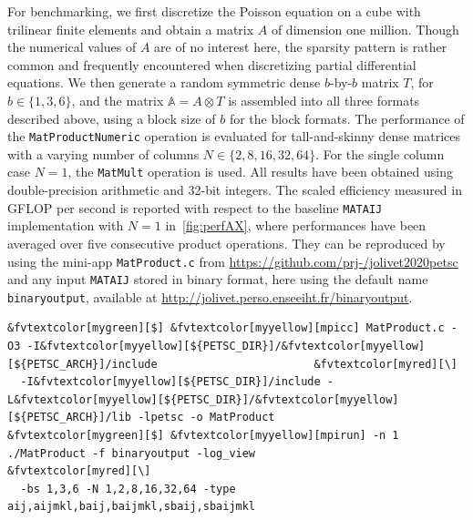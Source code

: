 \documentclass[3p,11pt]{elsarticle}
\newcommand{\pk}[1]{\texttt{#1}}
\begin{document}
For benchmarking, we first discretize the Poisson equation on a cube with trilinear finite elements
and obtain a matrix $A$ of dimension one million. Though the numerical
values of $A$ are of no interest here, the sparsity pattern is rather common and frequently encountered when
discretizing partial differential equations. We then generate a random symmetric dense $b$-by-$b$ matrix $T$,
for $b \in \{ 1,3,6 \}$, and the matrix $\mathbb{A} = A \otimes T$ is assembled into all three formats described above, using
a block size of $b$ for the block formats.
The performance of the \pk{MatProductNumeric} operation is evaluated for tall-and-skinny dense matrices with a varying number
of columns $N \in \{2,8,16,32,64\}$. For the single column case $N=1$, the \pk{MatMult} operation is used.
All results have been obtained using double-precision arithmetic and 32-bit integers. The scaled efficiency measured in GFLOP per second is reported
with respect to the baseline \pk{MATAIJ} implementation with $N=1$ in~\cref{fig:perfAX}, where performances have been averaged over five consecutive
product operations.
They can be reproduced by using the mini-app \texttt{MatProduct.c} from \url{https://github.com/prj-/jolivet2020petsc} and any input \pk{MATAIJ} stored in binary format,
here using the default name \pk{binaryoutput}, available at \url{http://jolivet.perso.enseeiht.fr/binaryoutput}.
\begin{Verbatim}[fontsize=\footnotesize,frame=single,framerule=0.1mm,commandchars=&\[\]]
&fvtextcolor[mygreen][$] &fvtextcolor[myyellow][mpicc] MatProduct.c -O3 -I&fvtextcolor[myyellow][${PETSC_DIR}]/&fvtextcolor[myyellow][${PETSC_ARCH}]/include                        &fvtextcolor[myred][\]
  -I&fvtextcolor[myyellow][${PETSC_DIR}]/include -L&fvtextcolor[myyellow][${PETSC_DIR}]/&fvtextcolor[myyellow][${PETSC_ARCH}]/lib -lpetsc -o MatProduct
&fvtextcolor[mygreen][$] &fvtextcolor[myyellow][mpirun] -n 1 ./MatProduct -f binaryoutput -log_view                                 &fvtextcolor[myred][\]
  -bs 1,3,6 -N 1,2,8,16,32,64 -type aij,aijmkl,baij,baijmkl,sbaij,sbaijmkl
\end{Verbatim}
\end{document}
